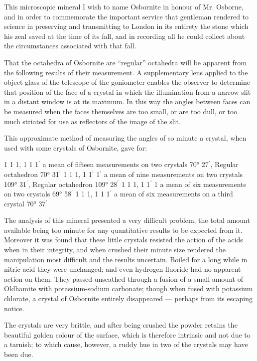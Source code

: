 \documentclass[a4paper, 12pt, oneside]{article}
\begin{document}
This microscopic mineral I wish to name Osbornite in honour of Mr. Osborne, and in order to commemorate the important service that gentleman rendered to science in preserving and transmitting to London in its entirety the stone which his zeal saved at the time of its fall, and in recording all he could collect about the circumstances associated with that fall.

That the octahedra of Osbornite are ``regular'' octahedra will be apparent from the following results of their measurement. A supplementary lens applied to the object-glass of the telescope of the goniometer enables the observer to determine that position of the face of a crystal in which the illumination from a narrow slit in a distant window is at its maximum. In this way the angles between faces can be measured when the faces themselves are too small, or are too dull, or too much striated for use as reflectors of the image of the slit.

This approximate method of measuring the angles of so minute a crystal, when used with some crystals of Osbornite, gave for:

1 1 1, 1 1 1$^{\prime}$ a mean of fifteen measurements on two crystals 70° 27$^{\prime}$, Regular octahedron 70° 31$^{\prime}$  
1 1 1, 1 1$^{\prime}$ 1$^{\prime}$ a mean of nine measurements on two crystals 109° 31$^{\prime}$, Regular octahedron 109° 28$^{\prime}$  
1 1 1, 1 1$^{\prime}$ 1 a mean of six measurements on two crystals 69° 58$^{\prime}$  
1 1 1, 1 1 1$^{\prime}$ a mean of six measurements on a third crystal 70° 37$^{\prime}$

The analysis of this mineral presented a very difficult problem, the total amount available being too minute for any quantitative results to be expected from it. Moreover it was found that these little crystals resisted the action of the acids when in their integrity, and when crushed their minute size rendered the manipulation most difficult and the results uncertain. Boiled for a long while in nitric acid they were unchanged; and even hydrogen fluoride had no apparent action on them. They passed unscathed through a fusion of a small amount of Oldhamite with potassium-sodium carbonate; though when fused with potassium chlorate, a crystal of Osbornite entirely disappeared --- perhaps from its escaping notice.

The crystals are very brittle, and after being crushed the powder retains the beautiful golden colour of the surface, which is therefore intrinsic and not due to a tarnish; to which cause, however, a ruddy hue in two of the crystals may have been due.
\end{document}
